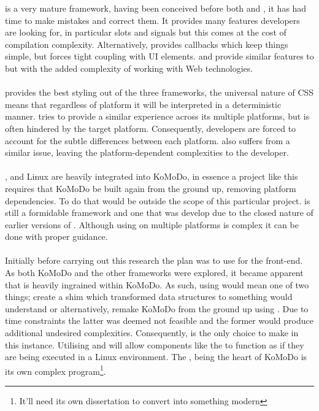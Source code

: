  is a very mature framework, having been conceived before both  and , it has had time to make mistakes and correct them. It provides many features developers are looking for, in particular slots and signals but this comes at the cost of compilation complexity. Alternatively,  provides callbacks which keep things simple, but forces tight coupling with UI elements.  and  provide similar features to  but with the added complexity of working with Web technologies.\\\\
%
 provides the best styling out of the three frameworks, the universal nature of CSS means that regardless of platform it will be interpreted in a deterministic manner.  tries to provide a similar experience across its multiple platforms, but is often hindered by the target platform. Consequently, developers are forced to account for the subtle differences between each platform.  also suffers from a similar issue, leaving the platform-dependent complexities to the developer.\\\\
%
,  and Linux are heavily integrated into KoMoDo, in essence a project like this requires that KoMoDo be built again from the ground up, removing platform dependencies. To do that would be outside the scope of this particular project.  is still a formidable framework and one that was develop due to the closed nature of earlier versions of . Although using  on multiple platforms is complex it can be done with proper guidance.\\\\
%
Initially before carrying out this research the plan was to use  for the front-end. As both KoMoDo and the other frameworks were explored, it became apparent that  is heavily ingrained within KoMoDo. As such, using  would mean one of two things; create a shim which transformed  data structures to something  would understand or alternatively, remake KoMoDo from the ground up using . Due to time constraints the latter was deemed not feasible and the former would produce additional undesired complexities. Consequently,  is the only choice to make in this instance. Utilising  and  will allow components like the  to function as if they are being executed in a Linux environment. The , being the heart of KoMoDo is its own complex program\footnote{It'll need its own dissertation to convert into something modern}.

